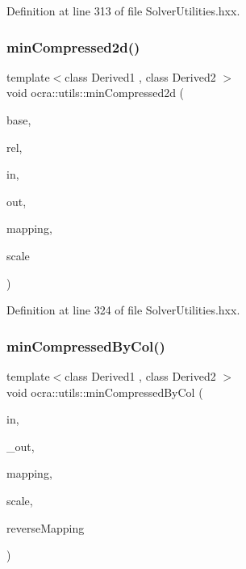 Definition at line 313 of file Solver\+Utilities.\+hxx.

\hypertarget{namespaceocra_1_1utils_a9b0fce276b5edf71568e40517bf567ac}{}\label{namespaceocra_1_1utils_a9b0fce276b5edf71568e40517bf567ac} 
\subsubsection{\texorpdfstring{min\+Compressed2d()}{minCompressed2d()}\hspace{0.1cm}{\footnotesize\ttfamily [2/2]}}
{\footnotesize\ttfamily template$<$class Derived1 , class Derived2 $>$ \\
void ocra\+::utils\+::min\+Compressed2d (\begin{DoxyParamCaption}\item[{const \hyperlink{classocra_1_1Variable}{Variable} \&}]{base,  }\item[{const \hyperlink{classocra_1_1Variable}{Variable} \&}]{rel,  }\item[{const Matrix\+Base$<$ Derived1 $>$ \&}]{in,  }\item[{Matrix\+Base$<$ Derived2 $>$ const \&}]{out,  }\item[{std\+::vector$<$ int $>$ \&}]{mapping,  }\item[{double}]{scale }\end{DoxyParamCaption})\hspace{0.3cm}{\ttfamily [inline]}}



Definition at line 324 of file Solver\+Utilities.\+hxx.

\hypertarget{namespaceocra_1_1utils_ab527c3744d4c3ca93750164c91a9c3dd}{}\label{namespaceocra_1_1utils_ab527c3744d4c3ca93750164c91a9c3dd} 
\subsubsection{\texorpdfstring{min\+Compressed\+By\+Col()}{minCompressedByCol()}\hspace{0.1cm}{\footnotesize\ttfamily [1/2]}}
{\footnotesize\ttfamily template$<$class Derived1 , class Derived2 $>$ \\
void ocra\+::utils\+::min\+Compressed\+By\+Col (\begin{DoxyParamCaption}\item[{const Matrix\+Base$<$ Derived1 $>$ \&}]{in,  }\item[{Matrix\+Base$<$ Derived2 $>$ const \&}]{\+\_\+out,  }\item[{const std\+::vector$<$ int $>$ \&}]{mapping,  }\item[{double}]{scale,  }\item[{bool}]{reverse\+Mapping }\end{DoxyParamCaption})\hspace{0.3cm}{\ttfamily [inline]}}



